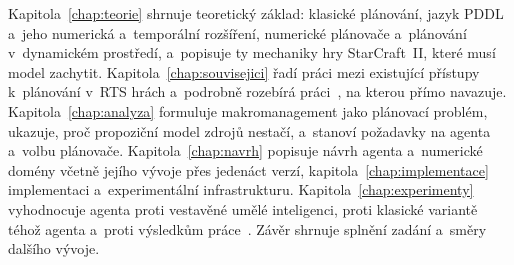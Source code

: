 Kapitola~\ref{chap:teorie} shrnuje teoretický základ: klasické plánování, jazyk PDDL a~jeho numerická a~temporální rozšíření, numerické plánovače a~plánování v~dynamickém prostředí, a~popisuje ty mechaniky hry StarCraft~II, které musí model zachytit. Kapitola~\ref{chap:souvisejici} řadí práci mezi existující přístupy k~plánování v~RTS hrách a~podrobně rozebírá práci~\cite{Orava2025}, na kterou přímo navazuje. Kapitola~\ref{chap:analyza} formuluje makromanagement jako plánovací problém, ukazuje, proč propoziční model zdrojů nestačí, a~stanoví požadavky na agenta a~volbu plánovače. Kapitola~\ref{chap:navrh} popisuje návrh agenta a~numerické domény včetně jejího vývoje přes jedenáct verzí, kapitola~\ref{chap:implementace} implementaci a~experimentální infrastrukturu. Kapitola~\ref{chap:experimenty} vyhodnocuje agenta proti vestavěné umělé inteligenci, proti klasické variantě téhož agenta a~proti výsledkům práce~\cite{Orava2025}. Závěr shrnuje splnění zadání a~směry dalšího vývoje.
